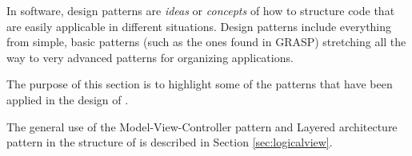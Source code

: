 In software, design patterns are \emph{ideas} or \emph{concepts} of how to structure code that are easily applicable
in different situations. Design patterns include everything from simple, basic patterns (such as the ones found in
GRASP) stretching all the way to very advanced patterns for organizing applications.

The purpose of this section is to highlight some of the patterns that have been applied in the design of \SOP{}.

The general use of the Model-View-Controller pattern and Layered architecture pattern in the structure of \SOP{} 
is described in Section \ref{sec:logicalview}.






